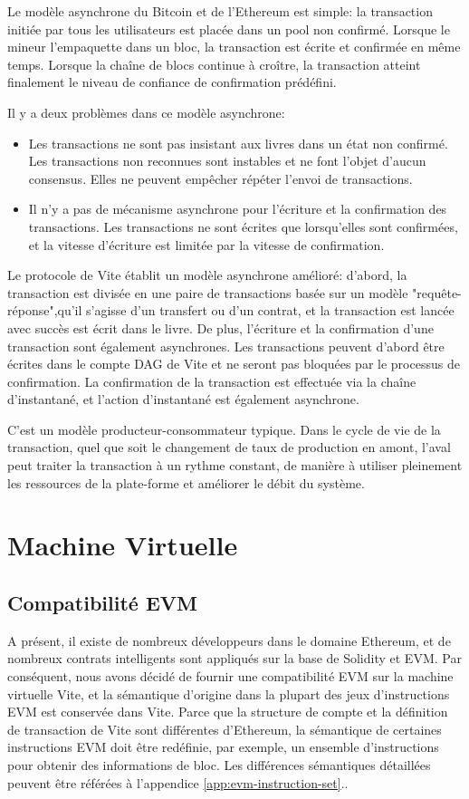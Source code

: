 \documentclass[UTF8,nofonts]{article}
\begin{document}
\begin{multicols}{2}
Le modèle asynchrone du Bitcoin et de l'Ethereum est simple: la transaction initiée par tous les utilisateurs est placée dans un pool non confirmé. Lorsque le mineur l'empaquette dans un bloc, la transaction est écrite et confirmée en même temps. Lorsque la chaîne de blocs continue à croître, la transaction atteint finalement le niveau de confiance de confirmation prédéfini.

Il y a deux problèmes dans ce modèle asynchrone:
\begin{itemize}
	\item	Les transactions ne sont pas insistant aux livres dans un état non confirmé. Les transactions non reconnues sont instables et ne font l'objet d'aucun consensus. Elles ne peuvent empêcher répéter l'envoi de transactions.
	\item	Il n'y a pas de mécanisme asynchrone pour l'écriture et la confirmation des transactions. Les transactions ne sont écrites que lorsqu'elles sont confirmées, et la vitesse d'écriture est limitée par la vitesse de confirmation.
\end{itemize}

Le protocole de Vite établit un modèle asynchrone amélioré: d'abord, la transaction est divisée en une paire de transactions basée sur un modèle "requête-réponse",qu'il s'agisse d'un transfert ou d'un contrat, et la transaction est lancée avec succès est écrit dans le livre. De plus, l'écriture et la confirmation d'une transaction sont également asynchrones. Les transactions peuvent d'abord être écrites dans le compte DAG de Vite et ne seront pas bloquées par le processus de confirmation. La confirmation de la transaction est effectuée via la chaîne d'instantané, et l'action d'instantané est également asynchrone.

C'est un modèle producteur-consommateur typique. Dans le cycle de vie de la transaction, quel que soit le changement de taux de production en amont, l'aval peut traiter la transaction à un rythme constant, de manière à utiliser pleinement les ressources de la plate-forme et améliorer le débit du système.

\section{Machine Virtuelle}
\subsection{Compatibilité EVM}
A présent, il existe de nombreux développeurs dans le domaine Ethereum, et de nombreux contrats intelligents sont appliqués sur la base de Solidity et EVM. Par conséquent, nous avons décidé de fournir une compatibilité EVM sur la machine virtuelle Vite, et la sémantique d'origine dans la plupart des jeux d'instructions EVM est conservée dans Vite. Parce que la structure de compte et la définition de transaction de Vite sont différentes d'Ethereum, la sémantique de certaines instructions EVM doit être redéfinie, par exemple, un ensemble d'instructions pour obtenir des informations de bloc. Les différences sémantiques détaillées peuvent être référées à l'appendice \ref{app:evm-instruction-set}..


\end{multicols}
\end{document}
